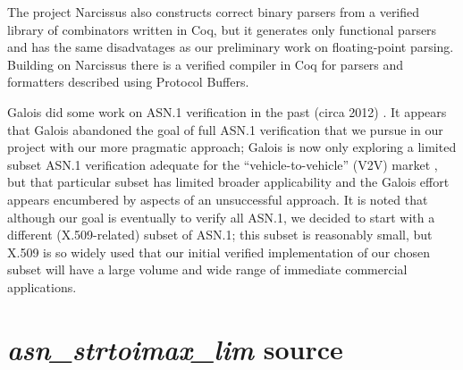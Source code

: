 \documentclass[acmsmall,nonacm]{acmart}
\begin{document}
The project Narcissus \cite{Narcissus} also constructs correct binary parsers from a verified
library of combinators written in Coq, but it generates only functional
parsers and has the same disadvatages as our preliminary work on floating-point parsing. Building on Narcissus there is a verified compiler in Coq for
parsers and formatters described using Protocol Buffers.
 
Galois did some work on ASN.1 verification in
the past (circa 2012) \cite{ASN1FormalSem}. It appears that Galois abandoned
\cite{ASN1EncDec} the goal of full ASN.1 verification that we pursue in
our project with our more pragmatic approach; Galois is now only
exploring a limited subset ASN.1 verification adequate for the
``vehicle-to-vehicle'' (V2V) market \cite{V2V}, but that
particular subset has limited broader applicability and the Galois
effort appears encumbered by aspects of an unsuccessful approach. It
is noted that although our goal is eventually to verify all ASN.1, we
decided to start with a different (X.509-related) subset of ASN.1;
this subset is reasonably small, but X.509 is so widely used that our
initial verified implementation of our chosen subset will have a large
volume and wide range of immediate commercial applications.

\appendix
\clearpage
\section{\emph{asn\_strtoimax\_lim} source}
\label{sec:stritomax}





\end{document}
